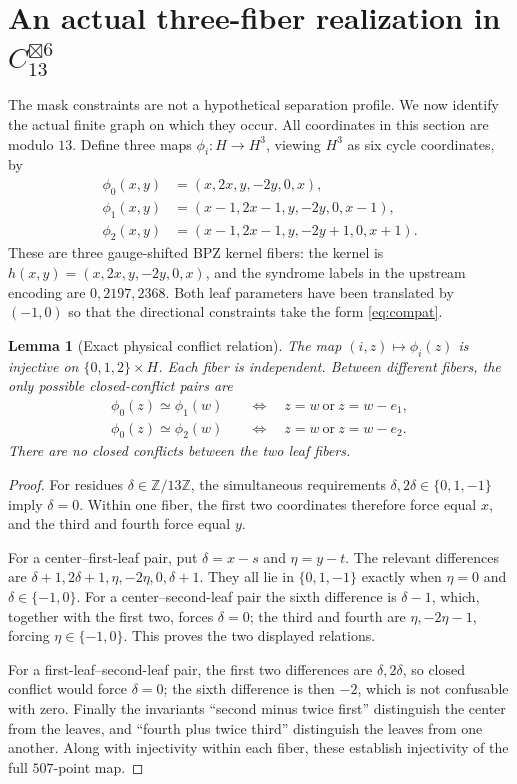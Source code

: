 \documentclass[11pt,a4paper]{article}
\newtheorem{lemma}[theorem]{Lemma}
\theoremstyle{definition}
\theoremstyle{remark}
\newcommand{\Z}{\mathbb Z}
\newcommand{\conf}{\mathrel{\simeq}}
\begin{document}
\section{An actual three-fiber realization in \texorpdfstring{$C_{13}^{\boxtimes6}$}{C13\string^6}}
The mask constraints are not a hypothetical separation profile. We now
identify the actual finite graph on which they occur. All coordinates in
this section are modulo $13$. Define three maps $\phi_i:H\to H^3$,
viewing $H^3$ as six cycle coordinates, by
\begin{align}
 \phi_0(x,y)&=(x,2x,y,-2y,0,x),\nonumber\\
 \phi_1(x,y)&=(x-1,2x-1,y,-2y,0,x-1),\label{eq:physical}\\
 \phi_2(x,y)&=(x-1,2x-1,y,-2y+1,0,x+1).\nonumber
\end{align}
These are three gauge-shifted BPZ kernel fibers: the kernel is
$h(x,y)=(x,2x,y,-2y,0,x)$, and the syndrome labels in the upstream
encoding are $0,2197,2368$. Both leaf parameters have been translated
by $(-1,0)$ so that the directional constraints take the form
\eqref{eq:compat}.

\begin{lemma}[Exact physical conflict relation]\label{lem:physical}
The map $(i,z)\mapsto\phi_i(z)$ is injective on $\{0,1,2\}\times H$.
Each fiber is independent. Between different fibers, the only possible
closed-conflict pairs are
\begin{align*}
 \phi_0(z)\conf\phi_1(w)&\quad\Longleftrightarrow\quad z=w\ \text{or}\ z=w-e_1,\\
 \phi_0(z)\conf\phi_2(w)&\quad\Longleftrightarrow\quad z=w\ \text{or}\ z=w-e_2.
\end{align*}
There are no closed conflicts between the two leaf fibers.
\end{lemma}
\begin{proof}
For residues $\delta\in\Z/13\Z$, the simultaneous requirements
$\delta,2\delta\in\{0,1,-1\}$ imply $\delta=0$. Within one fiber,
the first two coordinates therefore force equal $x$, and the third
and fourth force equal $y$.

For a center--first-leaf pair, put $\delta=x-s$ and $\eta=y-t$.
The relevant differences are
$\delta+1,2\delta+1,\eta,-2\eta,0,\delta+1$.
They all lie in $\{0,1,-1\}$ exactly when $\eta=0$ and
$\delta\in\{-1,0\}$. For a center--second-leaf pair the sixth
difference is $\delta-1$, which, together with the first two,
forces $\delta=0$; the third and fourth are $\eta,-2\eta-1$,
forcing $\eta\in\{-1,0\}$. This proves the two displayed relations.

For a first-leaf--second-leaf pair, the first two differences are
$\delta,2\delta$, so closed conflict would force $\delta=0$;
the sixth difference is then $-2$, which is not confusable with zero.
Finally the invariants ``second minus twice first'' distinguish the
center from the leaves, and ``fourth plus twice third'' distinguish
the leaves from one another. Along with injectivity within each fiber,
these establish injectivity of the full $507$-point map.
\end{proof}
\end{document}

